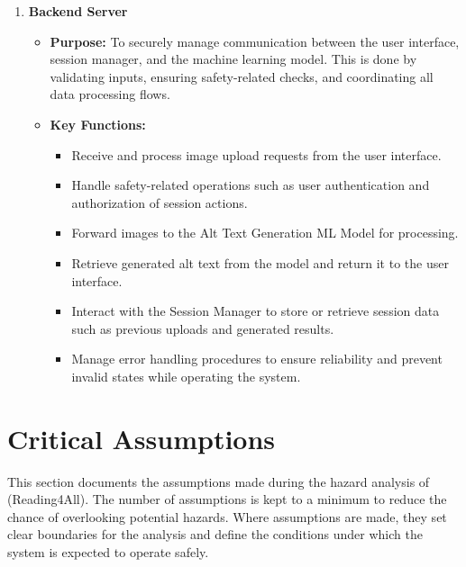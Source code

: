 \documentclass{article}
\begin{document}
\begin{enumerate}
\begin{itemize}
        session and manage user data during active use of the system.
      \item \textbf{Key Functions:}
        \begin{itemize}
          \item Track unique user sessions throughout interaction
            with the web application.
          \item Store previously uploaded images and generated
            alt text for the current session to allow users
            to view history.
        \end{itemize}
    \end{itemize}
    \item \textbf{Backend Server}
    \begin{itemize}
        \item \textbf{Purpose:} To securely manage communication between the user interface, session manager, and the machine learning model.
        This is done by validating inputs, ensuring safety-related checks, and coordinating all data processing flows.
        \item \textbf{Key Functions:}
        \begin{itemize}
            \item Receive and process image upload requests from the user interface.
            \item Handle safety-related operations such as user authentication and
            authorization of session actions.
            \item Forward images to the Alt Text Generation ML Model for processing.
            \item Retrieve generated alt text from the model and return it to the user interface. 
            \item Interact with the Session Manager to store or retrieve session data such as previous uploads and generated results.
            \item Manage error handling procedures to ensure reliability and prevent invalid states while operating the system.
        \end{itemize}
    \end{itemize}
\end{enumerate}
\section{Critical Assumptions}
This section documents the assumptions made during the hazard analysis of
\progname{} (Reading4All). The number of assumptions is kept to a minimum
to reduce the chance of overlooking potential hazards. Where assumptions
are made, they set clear boundaries for the analysis and define the
conditions under which the system is expected to operate safely.
\end{document}
